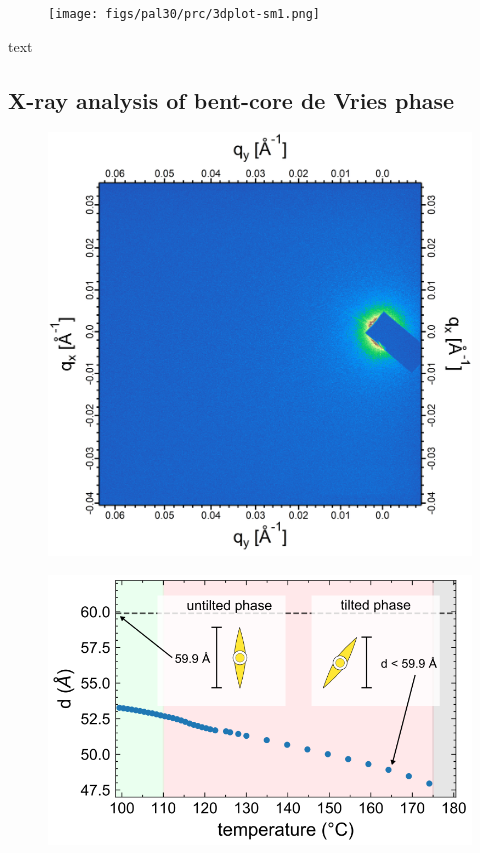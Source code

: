 \documentclass[aagreenthesis]{subfiles}
\begin{document}
\begin{figure}[h!]
    \centering
    \texttt{[image: figs/pal30/prc/3dplot-sm1.png]}
    \caption{\label{}}
\end{figure}
text

\subsection{X-ray analysis of bent-core de Vries phase}

\begin{figure}[h!]
    \centering
    \includegraphics[width=.8\textwidth]{figs/pal30/xraysm1/rsosxSmaT113-modified.png}
    \caption{\label{}}
\end{figure}


\begin{figure}[h!]
    \centering
    \includegraphics{figs/pal30/xraysm1/sm1-saxs-annote.png}
    \caption{\label{}}
\end{figure}
\end{document}

